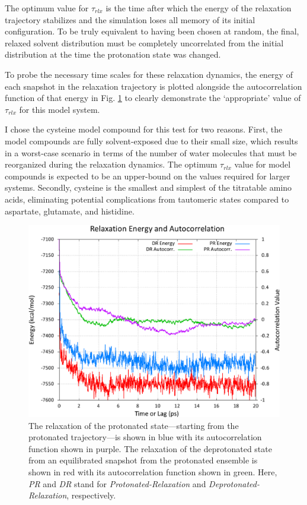 The optimum value for $\tau _ {rlx}$ is the time after which the energy of the
relaxation trajectory stabilizes and the simulation loses all memory of its
initial configuration. To be truly equivalent to having been chosen at random,
the final, relaxed solvent distribution must be completely uncorrelated from the
initial distribution at the time the protonation state was changed.

To probe the necessary time scales for these relaxation dynamics, the energy of
each snapshot in the relaxation trajectory is plotted alongside the
autocorrelation function of that energy in Fig. \ref{fig4:ntrelax_and_autocorr}
to clearly demonstrate the `appropriate' value of $\tau _ {rlx}$ for this model
system.

I chose the cysteine model compound for this test for two reasons. First, the
model compounds are fully solvent-exposed due to their small size, which results
in a worst-case scenario in terms of the number of water molecules that must be
reorganized during the relaxation dynamics. The optimum $\tau _ {rlx}$ value
for model compounds is expected to be an upper-bound on the values required for
larger systems. Secondly, cysteine is the smallest and simplest of the
titratable amino acids, eliminating potential complications from tautomeric
states compared to aspartate, glutamate, and histidine.

\begin{figure}
   \includegraphics[width=6in]{Cys_ntrelax_energies.eps}
   \caption{The relaxation of the protonated state---starting from the
            protonated trajectory---is shown in blue with its autocorrelation
            function shown in purple. The relaxation of the deprotonated state
            from an equilibrated snapshot from the protonated ensemble is shown
            in red with its autocorrelation function shown in green. Here,
            \emph{PR} and \emph{DR} stand for \emph{Protonated-Relaxation} and
            \emph{Deprotonated-Relaxation}, respectively.}
   \label{fig4:ntrelax_and_autocorr}
\end{figure}

